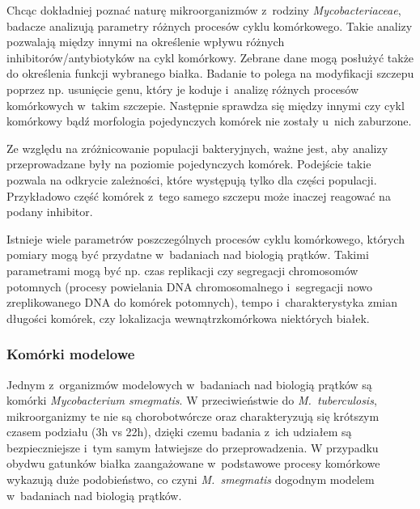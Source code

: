 \documentclass[declaration,shortabstract,mgr]{iithesis}
\begin{document}
Chcąc dokładniej poznać naturę mikroorganizmów z~rodziny \emph{Mycobacteriaceae}, badacze analizują parametry różnych procesów cyklu komórkowego.
Takie analizy pozwalają między innymi na określenie wpływu różnych inhibitorów/antybiotyków na cykl komórkowy\cite{paper:watching-dna-replication}.
Zebrane dane mogą posłużyć także do określenia funkcji wybranego białka\cite{paper:protein-responsibility}.
Badanie to polega na modyfikacji szczepu poprzez np. usunięcie genu, który je koduje i~analizę różnych procesów komórkowych w~takim szczepie.
Następnie sprawdza się między innymi czy cykl komórkowy bądź morfologia pojedynczych komórek nie zostały u~nich zaburzone.

Ze względu na zróżnicowanie populacji bakteryjnych, ważne jest, aby analizy przeprowadzane były na poziomie pojedynczych komórek.
Podejście takie pozwala na odkrycie zależności, które występują tylko dla części populacji.
Przykładowo część komórek z~tego samego szczepu może inaczej reagować na podany inhibitor.

Istnieje wiele parametrów poszczególnych procesów cyklu komórkowego, których pomiary mogą być przydatne w~badaniach nad biologią prątków.
Takimi parametrami mogą być np. czas replikacji czy segregacji chromosomów potomnych (procesy powielania DNA chromosomalnego i~segregacji nowo zreplikowanego DNA do komórek potomnych), tempo i~charakterystyka zmian długości komórek, czy lokalizacja wewnątrzkomórkowa niektórych białek.

\subsubsection{Komórki modelowe}

Jednym z~organizmów modelowych w~badaniach nad biologią prątków są komórki \emph{Mycobacterium smegmatis}.
W przeciwieństwie do \emph{M.~tuberculosis}, mikroorganizmy te nie są chorobotwórcze oraz charakteryzują się krótszym czasem podziału (3h vs 22h), dzięki czemu badania z~ich udziałem są bezpieczniejsze i~tym samym łatwiejsze do przeprowadzenia.
W przypadku obydwu gatunków białka zaangażowane w~podstawowe procesy komórkowe wykazują duże podobieństwo, co czyni \emph{M.~smegmatis} dogodnym modelem w~badaniach nad biologią prątków.
\end{document}
